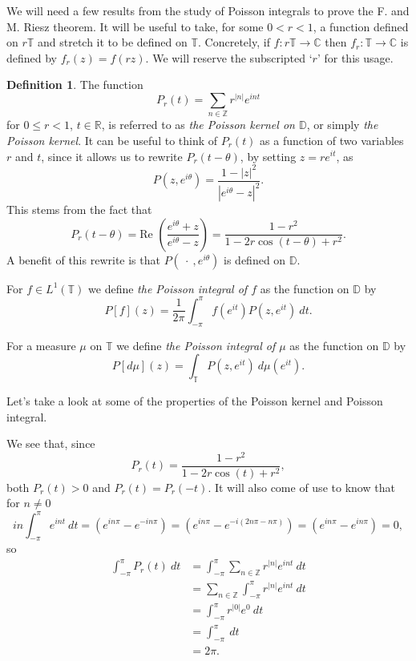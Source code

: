\documentclass[a4paper,12pt,twoside,BCOR=10mm]{scrbook}
\theoremstyle{definition}
\theoremstyle{definition}
\theoremstyle{definition}
\newtheorem{definition}[theorem]{Definition}
\renewcommand{\Re}{\text{Re }}
\begin{document}
We will need a few results from the study of Poisson integrals to prove the F. and M. Riesz theorem.
\label{index22}
It will be useful to take, for some $0 < r < 1$, a function defined on $r\mathbb{T}$ and stretch it to be defined on $\mathbb{T}$.
Concretely, if $f: r\mathbb{T} \rightarrow \mathbb{C}$ then $f_r: \mathbb{T} \rightarrow \mathbb{C}$ is defined by $f_r(z) = f(rz)$.
We will reserve the subscripted `$r$' for this usage.
\begin{definition}
\label{index21}
The function
\[
	P_r(t) = \sum_{n \in \mathbb{Z}} r^{|n|}e^{int}
\]
for $0 \leq r < 1$, $t \in \mathbb{R}$, is referred to as \emph{the Poisson kernel on $\mathbb{D}$}, or simply \emph{the Poisson kernel}.
It can be useful to think of $P_r(t)$ as a function of two variables $r$ and $t$, since it allows us to rewrite $P_r(t - \theta)$, by setting $z = re^{it}$, as
\[
	P(z, e^{i\theta}) = \frac{1 - |z|^2}{|e^{i\theta} - z|^2}.
\]
This stems from the fact that
\[
	P_r(t - \theta) = \Re \left ( \frac{e^{i\theta} + z}{e^{i\theta} - z}\right ) = \frac{1 - r^2}{1 - 2r\cos(t - \theta) + r^2}.
\]
A benefit of this rewrite is that $P(\ \cdot\ , e^{i\theta})$ is defined on $\mathbb{D}$.

For $f \in L^1(\mathbb{T})$ we define \emph{the Poisson integral of $f$} as the function on $\mathbb{D}$ by
\[
	P[f](z) = \frac{1}{2\pi} \int_{-\pi}^{\pi} f(e^{it})P(z, e^{it})\ dt.
\]

For a measure $\mu$ on $\mathbb{T}$ we define \emph{the Poisson integral of $\mu$} as the function on $\mathbb{D}$ by
\[
	P[d\mu](z) = \int_{\mathbb{T}} P(z, e^{it})\ d\mu(e^{it}).
\]

Let's take a look at some of the properties of the Poisson kernel and Poisson integral.
\end{definition}
We see that, since
\[
	P_r(t) = \frac{1 - r^2}{1 - 2r\cos(t) + r^2},
\]
both $P_r(t) > 0$ and $P_r(t) = P_r(-t)$.
It will also come of use to know that for $n \neq 0$
\[
	in\int_{-\pi}^{\pi} e^{int}\ dt
	= (e^{in\pi} - e^{-in\pi})
	= (e^{in\pi} - e^{-i(2n\pi - n\pi)})
	= (e^{in\pi} - e^{in\pi})
	= 0,
\]
so
\begin{align*}
	\int_{-\pi}^{\pi} P_r(t)\ dt
	&= \int_{-\pi}^{\pi} \sum_{n \in \mathbb{Z}} r^{|n|}e^{int}\ dt\\
	&= \sum_{n \in \mathbb{Z}} \int_{-\pi}^{\pi} r^{|n|}e^{int}\ dt\\
	&= \int_{-\pi}^{\pi} r^{|0|}e^{0}\ dt\\
	&= \int_{-\pi}^{\pi}\ dt\\
	&= 2\pi.
\end{align*}
\end{document}
